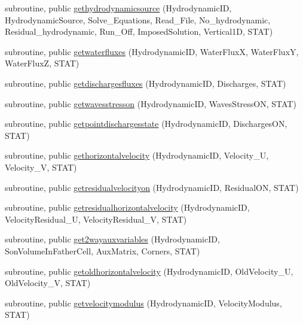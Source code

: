 \begin{DoxyCompactItemize}
\item 
subroutine, public \mbox{\hyperlink{namespacemodulehydrodynamic_ab585744f4ba5d5552dabea7edb88d98b}{gethydrodynamicsource}} (Hydrodynamic\+ID, Hydrodynamic\+Source, Solve\+\_\+\+Equations, Read\+\_\+\+File, No\+\_\+hydrodynamic, Residual\+\_\+hydrodynamic, Run\+\_\+\+Off, Imposed\+Solution, Vertical1D, S\+T\+AT)
\item 
subroutine, public \mbox{\hyperlink{namespacemodulehydrodynamic_a29f89183d9394468a6db08ec640599f1}{getwaterfluxes}} (Hydrodynamic\+ID, Water\+FluxX, Water\+FluxY, Water\+FluxZ, S\+T\+AT)
\item 
subroutine, public \mbox{\hyperlink{namespacemodulehydrodynamic_ae3e2525663a2551838685e1e108e3145}{getdischargesfluxes}} (Hydrodynamic\+ID, Discharges, S\+T\+AT)
\item 
subroutine, public \mbox{\hyperlink{namespacemodulehydrodynamic_a40c227e3eb106f2eae640e8533ab5e3b}{getwavesstresson}} (Hydrodynamic\+ID, Waves\+Stress\+ON, S\+T\+AT)
\item 
subroutine, public \mbox{\hyperlink{namespacemodulehydrodynamic_a6ebc590498ef2108834cad47a70d1f3a}{getpointdischargesstate}} (Hydrodynamic\+ID, Discharges\+ON, S\+T\+AT)
\item 
subroutine, public \mbox{\hyperlink{namespacemodulehydrodynamic_aba7eae61c437ef648710efabc4d39e36}{gethorizontalvelocity}} (Hydrodynamic\+ID, Velocity\+\_\+U, Velocity\+\_\+V, S\+T\+AT)
\item 
subroutine, public \mbox{\hyperlink{namespacemodulehydrodynamic_a987751c28d42e91f65901a19ca158b03}{getresidualvelocityon}} (Hydrodynamic\+ID, Residual\+ON, S\+T\+AT)
\item 
subroutine, public \mbox{\hyperlink{namespacemodulehydrodynamic_a5e97af02320deab67308d99bcf2745e1}{getresidualhorizontalvelocity}} (Hydrodynamic\+ID, Velocity\+Residual\+\_\+U, Velocity\+Residual\+\_\+V, S\+T\+AT)
\item 
subroutine, public \mbox{\hyperlink{namespacemodulehydrodynamic_a64e767d6cd62ef19087fffd022d0ca4a}{get2wayauxvariables}} (Hydrodynamic\+ID, Son\+Volume\+In\+Father\+Cell, Aux\+Matrix, Corners, S\+T\+AT)
\item 
subroutine, public \mbox{\hyperlink{namespacemodulehydrodynamic_a7161ffc34f27ea1c9e5f1f9bdc165d07}{getoldhorizontalvelocity}} (Hydrodynamic\+ID, Old\+Velocity\+\_\+U, Old\+Velocity\+\_\+V, S\+T\+AT)
\item 
subroutine, public \mbox{\hyperlink{namespacemodulehydrodynamic_a898445cf253d8a76844408350387b376}{getvelocitymodulus}} (Hydrodynamic\+ID, Velocity\+Modulus, S\+T\+AT)

\end{DoxyCompactItemize}

